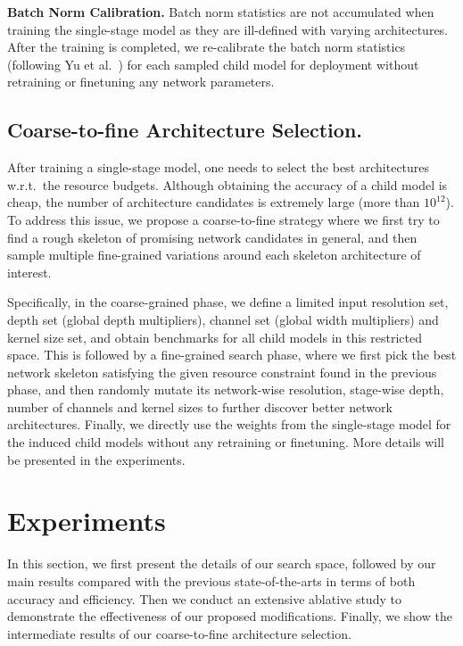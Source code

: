 \documentclass[runningheads]{llncs}
\begin{document}
\textbf{Batch Norm Calibration.}
Batch norm statistics are not accumulated when training the single-stage model as they are ill-defined with varying architectures. After the training is completed, we re-calibrate the batch norm statistics (following Yu et al.~\cite{yu2019universally}) for each sampled child model for deployment without retraining or finetuning any network parameters.

\subsection{Coarse-to-fine Architecture Selection.}
After training a single-stage model, one needs to select the best architectures w.r.t.\ the resource budgets. Although obtaining the accuracy of a child model is cheap, the number of architecture candidates is extremely large (more than \(10^{12}\)). To address this issue, we propose a coarse-to-fine strategy where we first try to find a rough skeleton of promising network candidates in general, and then sample multiple fine-grained variations around each skeleton architecture of interest.

Specifically, in the coarse-grained phase, we define a limited input resolution set, depth set (global depth multipliers), channel set (global width multipliers) and kernel size set, and obtain benchmarks for all child models in this restricted space. This is followed by a fine-grained search phase, where we first pick the best network skeleton satisfying the given resource constraint found in the previous phase, and then randomly mutate its network-wise resolution, stage-wise depth, number of channels and kernel sizes to further discover better network architectures. Finally, we directly use the weights from the single-stage model for the induced child models without any retraining or finetuning. More details will be presented in the experiments.
 
\section{Experiments}
In this section, we first present the details of our search space, followed by our main results compared with the previous state-of-the-arts in terms of both accuracy and efficiency. Then we conduct an extensive ablative study to demonstrate the effectiveness of our proposed modifications. Finally, we show the intermediate results of our coarse-to-fine architecture selection.
\end{document}
